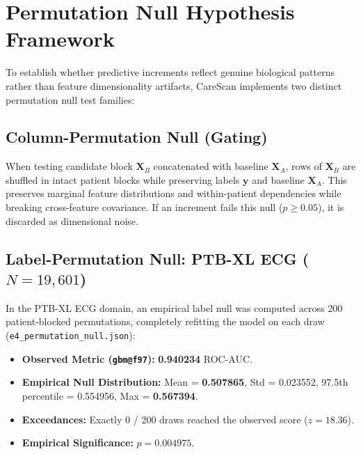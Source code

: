 \documentclass[11pt,a4paper]{report}
\newcommand{\artifact}[1]{\texttt{\footnotesize #1}}
\begin{document}
\section{Permutation Null Hypothesis Framework}
To establish whether predictive increments reflect genuine biological patterns rather than feature dimensionality artifacts, CareScan implements two distinct permutation null test families:

\subsection{Column-Permutation Null (Gating)}
When testing candidate block $\mathbf{X}_B$ concatenated with baseline $\mathbf{X}_A$, rows of $\mathbf{X}_B$ are shuffled in intact patient blocks while preserving labels $\mathbf{y}$ and baseline $\mathbf{X}_A$. This preserves marginal feature distributions and within-patient dependencies while breaking cross-feature covariance. If an increment fails this null ($p \ge 0.05$), it is discarded as dimensional noise.

\subsection{Label-Permutation Null: PTB-XL ECG ($N=19,601$)}
In the PTB-XL ECG domain, an empirical label null was computed across 200 patient-blocked permutations, completely refitting the model on each draw (\artifact{e4\_permutation\_null.json}):
\begin{itemize}
  \item \textbf{Observed Metric (\texttt{gbm@f97}):} \textbf{0.940234} ROC-AUC.
  \item \textbf{Empirical Null Distribution:} Mean = \textbf{0.507865}, Std = 0.023552, 97.5th percentile = 0.554956, Max = \textbf{0.567394}.
  \item \textbf{Exceedances:} Exactly 0 / 200 draws reached the observed score ($z = 18.36$).
  \item \textbf{Empirical Significance:} \textbf{$p = 0.004975$}.
\end{itemize}
\end{document}
